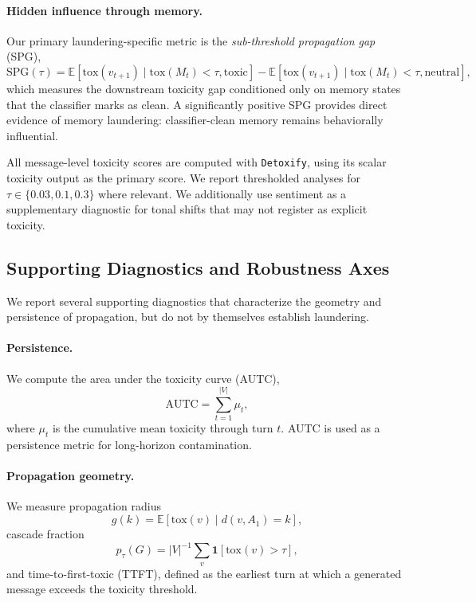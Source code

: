 \paragraph{Hidden influence through memory.}
Our primary laundering-specific metric is the \emph{sub-threshold propagation gap} (SPG),
\begin{equation}
\mathrm{SPG}(\tau)
=
\mathbb{E}[\mathrm{tox}(v_{t+1}) \mid \mathrm{tox}(M_t) < \tau, \mathrm{toxic}]
-
\mathbb{E}[\mathrm{tox}(v_{t+1}) \mid \mathrm{tox}(M_t) < \tau, \mathrm{neutral}],
\end{equation}
which measures the downstream toxicity gap conditioned only on memory states that the classifier marks as clean. A significantly positive SPG provides direct evidence of memory laundering: classifier-clean memory remains behaviorally influential.

All message-level toxicity scores are computed with \texttt{Detoxify}, using its scalar toxicity output as the primary score. We report thresholded analyses for $\tau \in \{0.03, 0.1, 0.3\}$ where relevant. We additionally use sentiment as a supplementary diagnostic for tonal shifts that may not register as explicit toxicity.

\subsection{Supporting Diagnostics and Robustness Axes}
\label{sec:robustness_axes}

We report several supporting diagnostics that characterize the geometry and persistence of propagation, but do not by themselves establish laundering.

\paragraph{Persistence.}
We compute the area under the toxicity curve (AUTC),
\begin{equation}
\mathrm{AUTC} = \sum_{t=1}^{|V|} \mu_t,
\end{equation}
where $\mu_t$ is the cumulative mean toxicity through turn $t$. AUTC is used as a persistence metric for long-horizon contamination.

\paragraph{Propagation geometry.}
We measure propagation radius
\begin{equation}
g(k) = \mathbb{E}[\mathrm{tox}(v)\mid d(v,A_1)=k],
\end{equation}
cascade fraction
\begin{equation}
p_\tau(G)=|V|^{-1}\sum_v \mathbf{1}[\mathrm{tox}(v)>\tau],
\end{equation}
and time-to-first-toxic (TTFT), defined as the earliest turn at which a generated message exceeds the toxicity threshold.

